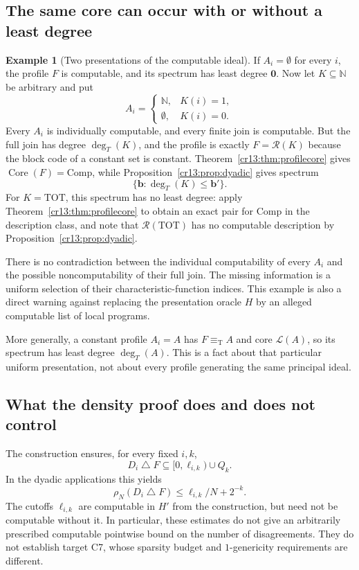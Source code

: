 \documentclass[11pt,letterpaper]{article}
\theoremstyle{definition}
\newtheorem{example}[theorem]{Example}
\theoremstyle{remark}\newtheorem{remark}[theorem]{Remark}
\numberwithin{equation}{section}
\newcommand{\N}{\mathbb N}
\newcommand{\eqT}{\equiv_{\mathrm T}}
\newcommand{\Low}{\mathcal L}
\newcommand{\Core}{\operatorname{Core}}
\newcommand{\Comp}{\mathrm{Comp}}
\newcommand{\TOT}{\mathrm{TOT}}
\newcommand{\Rc}{\mathcal R}
\newcommand{\sd}{\mathbin{\triangle}}
\newcommand{\zero}{\mathbf 0}
\begin{document}
\subsection{The same core can occur with or without a least degree}
\begin{example}[Two presentations of the computable ideal]\label{cr13:ex:presentation}
If $A_i=\emptyset$ for every $i$, the profile $F$ is computable, and its spectrum has least degree $\zero$. Now let $K\subseteq\N$ be arbitrary and put
\[
 A_i=\begin{cases}\N,&K(i)=1,\\ \emptyset,&K(i)=0.\end{cases}
\]
Every $A_i$ is individually computable, and every finite join is computable. But the full join has degree $\deg_T(K)$, and the profile is exactly $F=\Rc(K)$ because the block code of a constant set is constant. Theorem~\ref{cr13:thm:profilecore} gives $\Core(F)=\Comp$, while Proposition~\ref{cr13:prop:dyadic} gives spectrum
\[
                         \{\mathbf b:\deg_T(K)\le\mathbf b'\}.
\]
For $K=\TOT$, this spectrum has no least degree: apply Theorem~\ref{cr13:thm:profilecore} to obtain an exact pair for $\Comp$ in the description class, and note that $\Rc(\TOT)$ has no computable description by Proposition~\ref{cr13:prop:dyadic}.
\end{example}
There is no contradiction between the individual computability of every $A_i$ and the possible noncomputability of their full join. The missing information is a uniform selection of their characteristic-function indices. This example is also a direct warning against replacing the presentation oracle $H$ by an alleged computable list of local programs.

More generally, a constant profile $A_i=A$ has $F\eqT A$ and core $\Low(A)$, so its spectrum has least degree $\deg_T(A)$. This is a fact about that particular uniform presentation, not about every profile generating the same principal ideal.

\subsection{What the density proof does and does not control}\label{cr13:sec:density}
The construction ensures, for every fixed $i,k$,
\[
              D_i\sd F\subseteq[0,\ell_{i,k})\cup Q_k.
\]
In the dyadic applications this yields
\[
                \rho_N(D_i\sd F)\le\ell_{i,k}/N+2^{-k}.
\]
The cutoffs $\ell_{i,k}$ are computable in $H'$ from the construction, but need not be computable without it. In particular, these estimates do not give an arbitrarily prescribed computable pointwise bound on the number of disagreements. They do not establish target C7, whose sparsity budget and $1$-genericity requirements are different.
\end{document}
